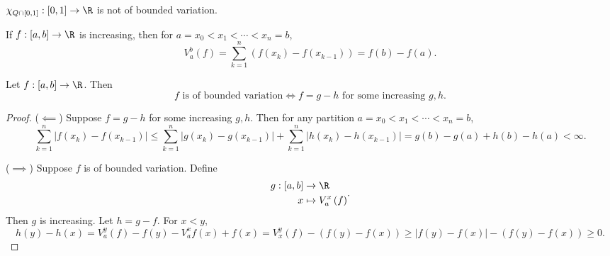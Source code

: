 \documentclass[pmath451]{subfiles}
\begin{document}
    \begin{example}{}
        $\chi_{Q\cap\left[ 0,1 \right]}:\left[ 0,1 \right]\to\R$ is not of bounded variation.
    \end{example}

    \rruleline
    
    \begin{example}{}
        If $f:\left[ a,b \right]\to\R$ is increasing, then for $a=x_0<x_1<\cdots<x_n=b$,
        \begin{equation*}
            V^b_a\left( f \right) = \sum^{n}_{k=1} \left( f\left( x_k \right)-f\left( x_{k-1} \right) \right) = f\left( b \right)-f\left( a \right).
        \end{equation*}
    \end{example}
    
    \rruleline
    
    \begin{prop}{}
        Let $f:\left[ a,b \right]\to\R$. Then
        \begin{equation*}
            \text{$f$ is of bounded variation} \iff f=g-h\text{ for some increasing $g,h$.}
        \end{equation*}
    \end{prop}

    \begin{proof}
        ($\impliedby$) Suppose $f=g-h$ for some increasing $g,h$. Then for any partition $a=x_0<x_1<\cdots<x_n=b$,
        \begin{equation*}
            \sum^{n}_{k=1} \left| f\left( x_k \right)-f\left( x_{k-1} \right) \right| \leq \sum^{n}_{k=1} \left| g\left( x_k \right)-g\left( x_{k-1} \right) \right|+\sum^{n}_{k=1} \left| h\left( x_k \right)-h\left( x_{k-1} \right) \right| = g\left( b \right)-g\left( a \right)+h\left( b \right)-h\left( a \right) < \infty.
        \end{equation*}

        ($\implies$) Suppose $f$ is of bounded variation. Define
        \begin{equation*}
            \begin{aligned}
                g:\left[ a,b \right]&\to\R\\
                x&\mapsto V^x_a\left( f \right)
            \end{aligned} .
        \end{equation*}
        Then $g$ is increasing. Let $h=g-f$. For $x<y$,
        \begin{equation*}
            h\left( y \right) - h\left( x \right) = V^y_a\left( f \right) - f\left( y \right)-V^x_af\left( x \right)+f\left( x \right) = V^y_x\left( f \right)-\left( f\left( y \right)-f\left( x \right) \right) \geq \left| f\left( y \right)-f\left( x \right) \right|-\left( f\left( y \right)-f\left( x \right) \right) \geq 0.
        \end{equation*}
    \end{proof}
\end{document}
